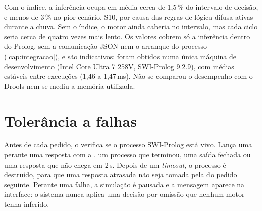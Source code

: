 Com o índice, a inferência ocupa em média cerca de 1,5\,\% do intervalo de
decisão, e menos de 3\,\% no pior cenário, S10, por causa das regras de lógica
difusa ativas durante a chuva. Sem o índice, o motor ainda caberia no intervalo,
mas cada ciclo seria cerca de quatro vezes mais lento. Os valores cobrem só a
inferência dentro do Prolog, sem a comunicação JSON nem o arranque do processo
(\cref{cap:integracao}), e são indicativos: foram obtidos numa única máquina de
desenvolvimento (Intel Core Ultra 7 258V, SWI-Prolog 9.2.9), com médias estáveis
entre execuções (1,46 a 1,47\,ms). Não se comparou o desempenho com o Drools nem
se mediu a memória utilizada.

\section{Tolerância a falhas}
\label{sec:tolerancia}

Antes de cada pedido, o  verifica se o processo SWI-Prolog
está vivo. Lança uma  perante uma resposta com
 a , um processo que terminou, uma saída fechada ou uma
resposta que não chega em 2\,s. Depois de um \emph{timeout}, o processo é
destruído, para que uma resposta atrasada não seja tomada pela do pedido
seguinte. Perante uma falha, a simulação é pausada e a mensagem aparece na
interface: o sistema nunca aplica uma decisão por omissão que nenhum motor tenha
inferido.
